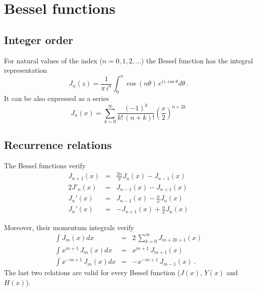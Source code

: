 \section{Bessel functions}

\subsection{Integer order}
\label{S:Bess-n}

For natural values of the index  ($n=0,1,2, \ldots$) the Bessel
function has the integral representation
\cite{Abramow1972_HOM,Gradsht1980_TOI,Galindo1990_QMvI}
\begin{equation}\label{Q:BesInt}
J_{n}(z)= \frac{1}{\pi \, i^{n}} \int_{0}^{\pi} \cos{(n \theta)} \,
e^{i z \, \cos{\theta}} d \theta \,.
\end{equation}
%
It can be also expressed as a series
\begin{equation}\label{Q:BesSum}
J_{n}(x) = \sum_{k=0}^{\infty} \frac{(-1)^{k}}{k!\, (n+k)!} \left(
\frac{x}{2} \right)^{n+2k}
\end{equation}

\subsection{Recurrence relations}
The Bessel functions verify
\begin{eqnarray}\label{Q:BesRecRel1}
  J_{n+1}(x) &=& \frac{2 n}{x} J_{n}(x) - J_{n-1}(x) \\
  2 J'_{n}(x) &=& J_{n-1}(x) - J_{n+1}(x) \label{Q:BesRecRe2} \\
  J_{n}'(x) &=& J_{n-1}(x) - \frac{n}{x} J_{n}(x) \label{Q:BesRecRe3}\\
  J_{n}'(x) &=& -J_{n+1}(x) + \frac{n}{x} J_{n}(x) \label{Q:BesRecRe4}
\end{eqnarray}

  \noindent
Moreover, their momentum integrals verify
\cite[(5.5.1-5.5.3)]{Gradsht1980_TOI}
\begin{eqnarray}\label{Q:BesMInta}
\int  J_{m}(x) d x &=& 2\,\sum_{k=0}^{\infty} J_{m+2k+1} (x)
\\
\int x^{m+1} \, J_{m}(x) d x &=& x^{m+1} \, J_{m+1} (x)
\label{Q:BesMIntb}
\\
\int x^{-m+1}\, J_{m}(x) d x
&=&-x^{-m+1}\,J_{m-1}(x)\,.\label{Q:BesMIntc}
\end{eqnarray}
The last two relations are valid for every Bessel function ($J(x)$,
$Y(x)$ and $H(x)$).


